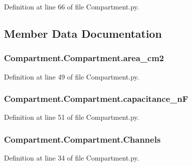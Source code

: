 Definition at line 66 of file Compartment.\-py.



\subsection{Member Data Documentation}
\hypertarget{class_compartment_1_1_compartment_a5d841c1a80dbaaf257dfc0a9cb763abc}{
\subsubsection[{area\-\_\-cm2}]{\setlength{\rightskip}{0pt plus 5cm}Compartment.\-Compartment.\-area\-\_\-cm2}}\label{class_compartment_1_1_compartment_a5d841c1a80dbaaf257dfc0a9cb763abc}


Definition at line 49 of file Compartment.\-py.

\hypertarget{class_compartment_1_1_compartment_ac7d7462a45d4d623ed688c187c9184aa}{
\subsubsection[{capacitance\-\_\-n\-F}]{\setlength{\rightskip}{0pt plus 5cm}Compartment.\-Compartment.\-capacitance\-\_\-n\-F}}\label{class_compartment_1_1_compartment_ac7d7462a45d4d623ed688c187c9184aa}


Definition at line 51 of file Compartment.\-py.

\hypertarget{class_compartment_1_1_compartment_aa444563be9598d7cc54fd8d10ea6a04f}{
\subsubsection[{Channels}]{\setlength{\rightskip}{0pt plus 5cm}Compartment.\-Compartment.\-Channels}}\label{class_compartment_1_1_compartment_aa444563be9598d7cc54fd8d10ea6a04f}


Definition at line 34 of file Compartment.\-py.

